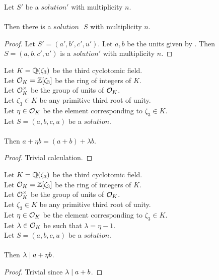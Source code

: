 \begin{lemma}
    \label{lmm:exists_Solution_of_Solution1}
    \leanok
    Let $S'$ be a $solution'$ with multiplicity $n$.\\\\
    Then there is a $solution\text{ }S$ with multiplicity $n$.
\end{lemma}
\begin{proof}
    \leanok
    Let $S'=(a',b',c',u')$. Let $a, b$ be the units given by .
    Then $S=(a,b,c',u')$ is a $solution'$ with multiplicity $n$.
\end{proof}

\begin{lemma}
    \label{lmm:a_add_eta_b}
    \leanok
    Let $K = \mathbb{Q}(\zeta_3)$ be the third cyclotomic field. \\
    Let $\mathcal{O}_K = \mathbb{Z}[\zeta_3]$ be the ring of integers of $K$. \\
    Let $\mathcal{O}^\times_K$ be the group of units of $\mathcal{O}_K$. \\
    Let $\zeta_3 \in K$ be any primitive third root of unity. \\
    Let $\eta \in \mathcal{O}_K$ be the element corresponding to $\zeta_3 \in K$. \\
    Let $S=(a, b, c, u)$ be a $solution$.\\\\
    Then $a + \eta  b = (a + b) + \lambda  b$.
\end{lemma}
\begin{proof}
    \leanok
    Trivial calculation.
\end{proof}

\begin{lemma}
    \label{lmm:lambda_dvd_a_add_eta_mul_b}
    \leanok
    Let $K = \mathbb{Q}(\zeta_3)$ be the third cyclotomic field. \\
    Let $\mathcal{O}_K = \mathbb{Z}[\zeta_3]$ be the ring of integers of $K$. \\
    Let $\mathcal{O}^\times_K$ be the group of units of $\mathcal{O}_K$. \\
    Let $\zeta_3 \in K$ be any primitive third root of unity. \\
    Let $\eta \in \mathcal{O}_K$ be the element corresponding to $\zeta_3 \in K$. \\
    Let $\lambda \in \mathcal{O}_K$ be such that $\lambda = \eta -1$. \\
    Let $S=(a, b, c, u)$ be a $solution$.\\\\
    Then $\lambda \mid a + \eta  b$.
\end{lemma}
\begin{proof}
    \leanok
    Trivial since $\lambda \mid a+b$.
\end{proof}

